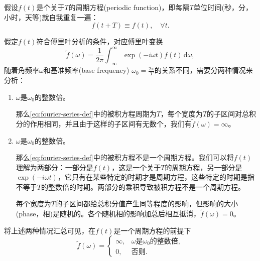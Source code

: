 假设$f(t)$是个关于$T$的周期方程(periodic function)，即每隔$T$单位时间(秒，分，小时，天等)就自我重复一遍：
\begin{equation*}
  f(t+T) \equiv f(t), \quad \forall t.
\end{equation*}

假定$f(t)$符合傅里叶分析的条件，对应傅里叶变换
\begin{equation}
  \label{eq:fourier-series-def}
  \tilde{f}(\omega) = \frac{1}{2 \pi} \int_{-\infty}^{\infty}
  \exp \left( - i \omega t \right) f(t) \, \mathrm{d} \omega,
\end{equation}
随着角频率$\omega$和基准频率(base frequency) $
\omega_{0}=\frac{2 \pi}{T}$的关系不同，需要分两种情况来分析：
\begin{enumerate}
  \item $\omega$是$\omega_{0}$的整数倍。

  那么\eqref{eq:fourier-series-def}中的被积方程周期为$T$，每个宽度为$T$的子区间对总积分的作用相同，并且由于这样的子区间有无数个，我们有$\tilde{f} \left( \omega \right) = \infty$。
  \item $\omega$是$\omega_{0}$的整数倍。

  那么\eqref{eq:fourier-series-def}中的被积方程不是一个周期方程。我们可以将$f(t)$理解为两部分：一部分是$f(t)$，这是一个关于$T$的周期方程，另一部分是$\exp \left( - i \omega t \right)$，它只有在某些特定的时期才是周期方程，这些特定的时期是指不等于$T$的整数倍的时期。两部分的乘积导致被积方程不是一个周期方程。

  每个宽度为$T$的子区间都给总积分值产生同等程度的影响，但影响的大小(phase，相)是随机的。各个随机相的影响加总后相互抵消，$\tilde{f}(\omega) =0$。
\end{enumerate}

将上述两种情况汇总可见，在$f(t)$是一个周期方程的前提下
\begin{equation*}
  \tilde{f}(\omega) =
  \begin{cases}
    \infty, & \omega\text{是}\omega_{0}\text{的整数倍},\\
    0, & \text{否则}.
  \end{cases}
\end{equation*}

